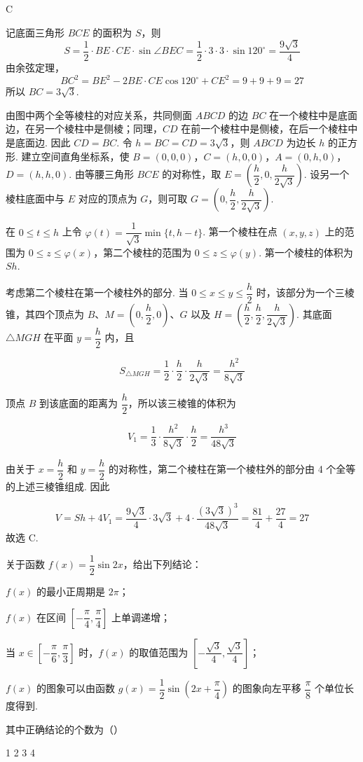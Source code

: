 \begin{answer}
C
\end{answer}

\begin{solution}
记底面三角形 \(BCE\) 的面积为 \(S\)，则
\[
S=\frac12\cdot BE\cdot CE\cdot\sin\angle BEC
=\frac12\cdot3\cdot3\cdot\sin120^\circ
=\frac{9\sqrt3}{4}
\]
由余弦定理，
\[
BC^2=BE^2-2BE\cdot CE\cos120^\circ+CE^2
=9+9+9=27
\]
所以 \(BC=3\sqrt3\).

由图中两个全等棱柱的对应关系，共同侧面 \(ABCD\) 的边 \(BC\) 在一个棱柱中是底面边，在另一个棱柱中是侧棱；同理，\(CD\) 在前一个棱柱中是侧棱，在后一个棱柱中是底面边. 因此 \(CD=BC\). 令 \(h=BC=CD=3\sqrt3\)，则 \(ABCD\) 为边长 \(h\) 的正方形.
建立空间直角坐标系，使
\(B=(0,0,0)\)，\(C=(h,0,0)\)，\(A=(0,h,0)\)，\(D=(h,h,0)\). 由等腰三角形 \(BCE\) 的对称性，取
\(E=\left(\dfrac h2,0,\dfrac{h}{2\sqrt3}\right)\). 设另一个棱柱底面中与 \(E\) 对应的顶点为 \(G\)，则可取
\(G=\left(0,\dfrac h2,\dfrac{h}{2\sqrt3}\right)\).

在 \(0\leq t\leq h\) 上令
\(\varphi(t)=\dfrac1{\sqrt3}\min\{t,h-t\}\). 第一个棱柱在点 \((x,y,z)\) 上的范围为 \(0\leq z\leq\varphi(x)\)，第二个棱柱的范围为 \(0\leq z\leq\varphi(y)\). 第一个棱柱的体积为 \(Sh\).

考虑第二个棱柱在第一个棱柱外的部分. 当 \(0\leq x\leq y\leq\dfrac h2\) 时，该部分为一个三棱锥，其四个顶点为
\(B\)、\(M=\left(0,\dfrac h2,0\right)\)、\(G\) 以及
\(H=\left(\dfrac h2,\dfrac h2,\dfrac{h}{2\sqrt3}\right)\). 其底面 \(\triangle MGH\) 在平面 \(y=\dfrac h2\) 内，且

\[
S_{\triangle MGH}=\frac12\cdot\frac h2\cdot\frac{h}{2\sqrt3}=\frac{h^2}{8\sqrt3}
\]

顶点 \(B\) 到该底面的距离为 \(\dfrac h2\)，所以该三棱锥的体积为

\[
V_1=\frac13\cdot\frac{h^2}{8\sqrt3}\cdot\frac h2=\frac{h^3}{48\sqrt3}
\]

由关于 \(x=\dfrac h2\) 和 \(y=\dfrac h2\) 的对称性，第二个棱柱在第一个棱柱外的部分由 4 个全等的上述三棱锥组成. 因此

\[
V=Sh+4V_1
=\frac{9\sqrt3}{4}\cdot3\sqrt3+4\cdot\frac{(3\sqrt3)^3}{48\sqrt3}
=\frac{81}{4}+\frac{27}{4}=27
\]
故选 C.
\end{solution}

\begin{problem}
关于函数 \(f(x)=\dfrac{1}{2}\sin 2x\)，给出下列结论：

\begin{circlelist}
\item \(f(x)\) 的最小正周期是 \(2\pi\)；
\item \(f(x)\) 在区间 \(\left[-\dfrac{\pi}{4},\dfrac{\pi}{4}\right]\) 上单调递增；
\item 当 \(x\in\left[-\dfrac{\pi}{6},\dfrac{\pi}{3}\right]\) 时，\(f(x)\) 的取值范围为 \(\left[-\dfrac{\sqrt{3}}{4},\dfrac{\sqrt{3}}{4}\right]\)；
\item \(f(x)\) 的图象可以由函数 \(g(x)=\dfrac{1}{2}\sin\left(2x+\dfrac{\pi}{4}\right)\) 的图象向左平移 \(\dfrac{\pi}{8}\) 个单位长度得到.
\end{circlelist}
其中正确结论的个数为（\quad）

\choices
    {1}
    {2}
    {3}
    {4}
\end{problem}

